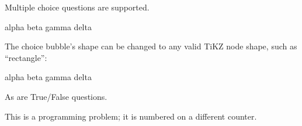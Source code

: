\documentclass{dscproblemset}
\begin{document}
\begin{probset}
    \newpage

    \begin{prob}
        Multiple choice questions are supported.

        \begin{choices}
            \choice alpha
            \correctchoice beta
            \choice gamma
            \choice delta
        \end{choices}

        The choice bubble's shape can be changed to any valid
        TiKZ node shape, such as ``rectangle'':

        \begin{choices}[rectangle]
            \choice alpha
            \correctchoice beta
            \choice gamma
            \choice delta
        \end{choices}
    \end{prob}

    \begin{prob}
        As are True/False questions.

        \Tf{}

    \end{prob}

    \renewcommand{\progprobtext}{Coding Problem}

    \begin{progprob}
        This is a programming problem; it is numbered on a different counter.

    \end{progprob}

\end{probset}

\scratchpage{}
\end{document}
